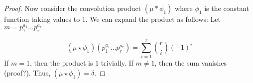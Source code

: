 \documentclass[Lang.tex]{subfiles}
\begin{document}
\begin{enumerate}
\begin{proof}
			Now consider the convolution product $ (\mu * \phi_1) $ where $\phi_1$ is the constant function taking values to $1$. We can expand the product as follows: Let $m = p_1^{a_1}...p_r^{a_r}$
			
			$$ (\mu \star \phi_1)(p_1^{a_1}...p_r^{a_r}) = \sum_{i = 1}^r {r \choose i} (-1)^i $$  If $m = 1$, then the product is $1$ trivially. If $m \neq 1$, then the sum vanishes (proof?). Thus, $(\mu \star \phi_1) = \delta$. 
		\end{proof}
\end{enumerate}
\end{document}
